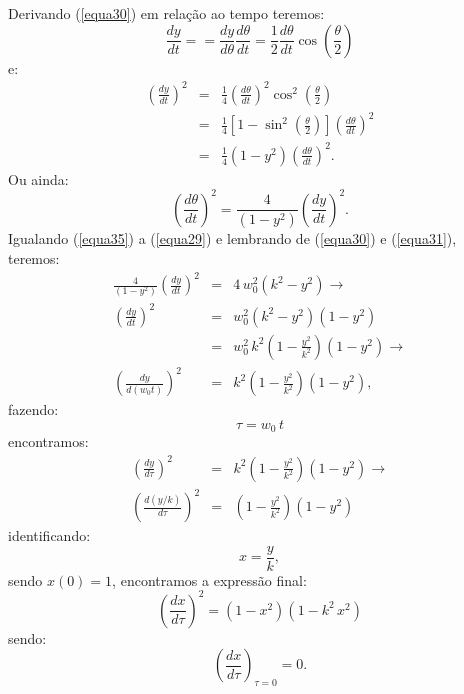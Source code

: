 \documentclass[12pt,openright,twoside,english,brazil]{abntex2}
\begin{document}
Derivando (\ref{equa30}) em relação ao tempo teremos:
\begin{equation}
 \frac{dy}{dt} = = \frac{dy}{d\theta} \frac{d\theta}{dt} = \frac{1}{2} \frac{d\theta}{dt} \cos{\left( \frac{\theta}{2} \right)}
\end{equation}
e:
\begin{eqnarray}
 \left( \frac{dy}{dt} \right)^2 & = & \frac{1}{4} \left( \frac{d\theta}  {dt} \right)^2 \cos^2{\left( \frac{\theta}{2} \right)} \nonumber \\
 & = & \frac{1}{4} \left[ 1 - \sin^2{\left( \frac{\theta}{2} \right)}  \right] \left( \frac{d\theta}{dt} \right)^2 \nonumber \\
 & = & \frac{1}{4} \left( 1 - y^2 \right) \left( \frac{d\theta}{dt} \right)^2.
\end{eqnarray}
Ou ainda:
\begin{equation}
 \left( \frac{d\theta}{dt} \right)^2 = \frac{4}{(1-y^2)} \left( \frac{dy}{dt} \right)^2
 \label{equa35}.
\end{equation}
Igualando (\ref{equa35}) a (\ref{equa29}) e lembrando de (\ref{equa30}) e (\ref{equa31}), teremos:
\begin{eqnarray}
 \frac{4}{(1-y^2)} \left( \frac{dy}{dt} \right)^2 & = & 4\, w_0^2 (k^2 - y^2) \rightarrow \nonumber \\
 \left( \frac{dy}{dt} \right)^2 & = & w_0^2 (k^2 - y^2) (1 - y^2) \nonumber \\
 & = & w_0^2\, k^2 \left( 1 - \frac{y^2}{k^2} \right) (1 - y^2) \rightarrow \nonumber \\
 \left( \frac{dy}{d(w_0t)} \right)^2 & = & k^2 \left( 1 - \frac{y^2}{k^2} \right) (1 - y^2),
\end{eqnarray}
fazendo:
\begin{equation}
 \tau = w_0\, t
 \label{equa37}
\end{equation}
encontramos:
\begin{eqnarray}
 \left( \frac{dy}{d\tau} \right)^2 & = & k^2 \left( 1 - \frac{y^2}{k^2} \right) (1 - y^2) \rightarrow \nonumber \\
 \left( \frac{d(y/k)}{d\tau} \right)^2 & = & \left( 1 - \frac{y^2}{k^2} \right) (1 - y^2)
\end{eqnarray}
identificando:
\begin{equation}
 x = \frac{y}{k},
 \label{equa39}
\end{equation}
sendo $x(0)=1$, encontramos a expressão final:
\begin{equation}
 \left( \frac{dx}{d\tau} \right)^2  =  (1 - x^2) (1 - k^2\, x^2)
 \label{equa40}
\end{equation}
sendo:
\begin{equation}
 \left( \frac{dx}{d\tau} \right)_{\tau=0} = 0.
\end{equation}
\end{document}
